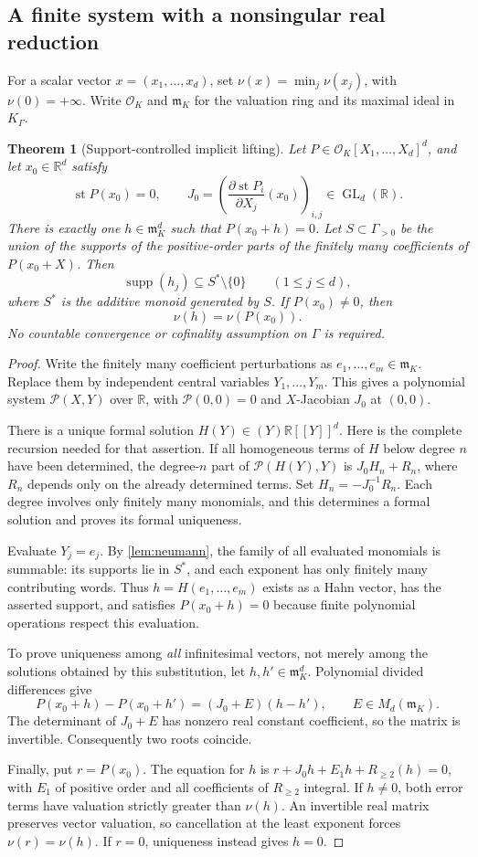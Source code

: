 \documentclass[11pt,letterpaper]{article}
\newtheorem{theorem}{Theorem}[section]
\theoremstyle{definition}
\newcommand{\R}{\mathbb R}
\newcommand{\KG}{K_\Gamma}
\newcommand{\OO}{\mathcal O}
\newcommand{\mm}{\mathfrak m}
\newcommand{\val}{\nu}
\DeclareMathOperator{\st}{st}
\DeclareMathOperator{\supp}{supp}
\DeclareMathOperator{\GL}{GL}
\begin{document}
\subsection{A finite system with a nonsingular real reduction}
For a scalar vector $x=(x_1,\ldots,x_d)$, set
$\val(x)=\min_j\val(x_j)$, with $\val(0)=+\infty$. Write $\OO_K$ and
$\mm_K$ for the valuation ring and its maximal ideal in $\KG$.

\begin{theorem}[Support-controlled implicit lifting]
\label{thm:lifting}
Let $P\in\OO_K[X_1,\ldots,X_d]^d$, and let $x_0\in\R^d$ satisfy
\[
 \st P(x_0)=0,\qquad
 J_0=\left(\frac{\partial\st P_i}{\partial X_j}(x_0)\right)_{i,j}
 \in\GL_d(\R).
\]
There is exactly one $h\in\mm_K^d$ such that $P(x_0+h)=0$.
Let $S\subset\Gamma_{>0}$ be the union of the supports of the positive-order
parts of the finitely many coefficients of $P(x_0+X)$. Then
\[
 \supp(h_j)\subseteq S^*\setminus\{0\}\qquad(1\leq j\leq d),
\]
where $S^*$ is the additive monoid generated by $S$. If $P(x_0)\ne0$, then
\[
 \val(h)=\val(P(x_0)).
\]
No countable convergence or cofinality assumption on $\Gamma$ is required.
\end{theorem}
\begin{proof}
Write the finitely many coefficient perturbations as $e_1,\ldots,e_m\in\mm_K$.
Replace them by independent central variables $Y_1,\ldots,Y_m$. This gives a
polynomial system $\mathcal P(X,Y)$ over $\R$, with
$\mathcal P(0,0)=0$ and $X$-Jacobian $J_0$ at $(0,0)$.

There is a unique formal solution $H(Y)\in(Y)\R[[Y]]^d$. Here is the complete
recursion needed for that assertion. If all homogeneous terms of $H$ below
degree $n$ have been determined, the degree-$n$ part of
$\mathcal P(H(Y),Y)$ is $J_0H_n+R_n$, where $R_n$ depends only on the already
determined terms. Set $H_n=-J_0^{-1}R_n$. Each degree involves only finitely
many monomials, and this determines a formal solution and proves its formal
uniqueness.

Evaluate $Y_j=e_j$. By \cref{lem:neumann}, the family of all evaluated
monomials is summable: its supports lie in $S^*$, and each exponent has only
finitely many contributing words. Thus $h=H(e_1,\ldots,e_m)$ exists as a Hahn
vector, has the asserted support, and satisfies $P(x_0+h)=0$ because finite
polynomial operations respect this evaluation.

To prove uniqueness among \emph{all} infinitesimal vectors, not merely among
the solutions obtained by this substitution, let $h,h'\in\mm_K^d$. Polynomial
divided differences give
\[
 P(x_0+h)-P(x_0+h')=(J_0+E)(h-h'),\qquad E\in M_d(\mm_K).
\]
The determinant of $J_0+E$ has nonzero real constant coefficient, so the
matrix is invertible. Consequently two roots coincide.

Finally, put $r=P(x_0)$. The equation for $h$ is
$r+J_0h+E_1h+R_{\geq2}(h)=0$, with $E_1$ of positive order and all
coefficients of $R_{\geq2}$ integral. If $h\ne0$, both error terms have
valuation strictly greater than $\val(h)$. An invertible real matrix preserves
vector valuation, so cancellation at the least exponent forces
$\val(r)=\val(h)$. If $r=0$, uniqueness instead gives $h=0$.
\end{proof}
\end{document}
